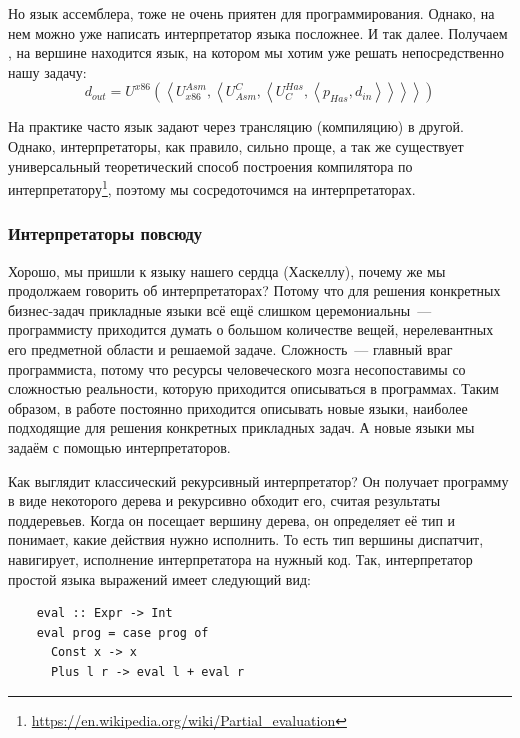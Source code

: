 Но язык ассемблера, тоже не очень приятен для программирования.
Однако, на нем можно уже написать интерпретатор языка посложнее.
И так далее.
Получаем , на вершине находится язык, на котором мы хотим уже решать непосредственно нашу задачу:
\[
    d_{out} =
    U^{x86}\left(\left<
                     U_{x86}^{Asm}, \left<
                                        U^C_{Asm}, \left<
                                                       U^{Has}_C, \left< p_{Has}, d_{in}
                \right>\right>\right>\right>\right)
\]

На практике часто язык задают через трансляцию (компиляцию) в другой.
Однако, интерпретаторы, как правило, сильно проще, а так же существует универсальный теоретический способ построения компилятора по интерпретатору\footnote{\url{https://en.wikipedia.org/wiki/Partial_evaluation}}, поэтому мы сосредоточимся на интерпретаторах.

\subsubsection{Интерпретаторы повсюду} \label{subsec:interpreters-everywhere}

Хорошо, мы пришли к языку нашего сердца (Хаскеллу), почему же мы продолжаем говорить об интерпретаторах?
Потому что для решения конкретных бизнес-задач прикладные языки всё ещё слишком церемониальны~--- программисту приходится думать о большом количестве вещей, нерелевантных его предметной области и решаемой задаче.
Сложность~--- главный враг программиста, потому что ресурсы человеческого мозга несопоставимы со сложностью реальности, которую приходится описываться в программах.
Таким образом, в работе постоянно приходится описывать новые языки, наиболее подходящие для решения конкретных прикладных задач.
А новые языки мы задаём с помощью интерпретаторов.

Как выглядит классический рекурсивный интерпретатор?
Он получает программу в виде некоторого дерева и рекурсивно обходит его, считая результаты поддеревьев.
Когда он посещает вершину дерева, он определяет её тип и понимает, какие действия нужно исполнить.
То есть тип вершины диспатчит, навигирует, исполнение интерпретатора на нужный код.
Так, интерпретатор простой языка выражений имеет следующий вид:
\begin{verbatim}
    eval :: Expr -> Int
    eval prog = case prog of
      Const x -> x
      Plus l r -> eval l + eval r
\end{verbatim}

